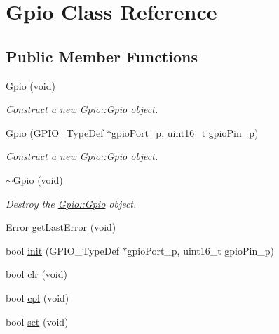 \hypertarget{class_gpio}{}\section{Gpio Class Reference}
\label{class_gpio}
\subsection*{Public Member Functions}
\begin{DoxyCompactItemize}
\item 
\hypertarget{class_gpio_a99fed5d9b35a8389c40c63eaaa8385dc}{}\hyperlink{class_gpio_a99fed5d9b35a8389c40c63eaaa8385dc}{Gpio} (void)\label{class_gpio_a99fed5d9b35a8389c40c63eaaa8385dc}

\begin{DoxyCompactList}\small\item\em Construct a new \hyperlink{class_gpio_a99fed5d9b35a8389c40c63eaaa8385dc}{Gpio\+::\+Gpio} object. \end{DoxyCompactList}\item 
\hyperlink{class_gpio_af6c85b01275e46b59ab0fd53b267a1b0}{Gpio} (G\+P\+I\+O\+\_\+\+Type\+Def $\ast$gpio\+Port\+\_\+p, uint16\+\_\+t gpio\+Pin\+\_\+p)
\begin{DoxyCompactList}\small\item\em Construct a new \hyperlink{class_gpio_a99fed5d9b35a8389c40c63eaaa8385dc}{Gpio\+::\+Gpio} object. \end{DoxyCompactList}\item 
\hypertarget{class_gpio_a0c1b7069e8485e81ffee504bac6d720d}{}\hyperlink{class_gpio_a0c1b7069e8485e81ffee504bac6d720d}{$\sim$\+Gpio} (void)\label{class_gpio_a0c1b7069e8485e81ffee504bac6d720d}

\begin{DoxyCompactList}\small\item\em Destroy the \hyperlink{class_gpio_a99fed5d9b35a8389c40c63eaaa8385dc}{Gpio\+::\+Gpio} object. \end{DoxyCompactList}\item 
Error \hyperlink{class_gpio_a257ddbd4f1b691fed8dfcdd3853cac90}{get\+Last\+Error} (void)
\item 
bool \hyperlink{class_gpio_affa4d2741c705c5e40a3e2137b303fed}{init} (G\+P\+I\+O\+\_\+\+Type\+Def $\ast$gpio\+Port\+\_\+p, uint16\+\_\+t gpio\+Pin\+\_\+p)
\item 
bool \hyperlink{class_gpio_ab1acc5af68efdcaa0ff428ebd98e84f7}{clr} (void)
\item 
bool \hyperlink{class_gpio_a40af09a22962f57fb0184eb4759acee3}{cpl} (void)
\item 
bool \hyperlink{class_gpio_a47c4e23e74ff7b2b3eaadac7695474e2}{set} (void)
\end{DoxyCompactItemize}
